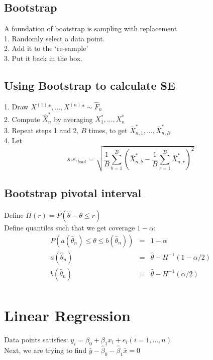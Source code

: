 \documentclass[12pt,a4paper]{article}
\begin{document}
\subsection*{Bootstrap}
A foundation of bootstrap is sampling with replacement\\
1. Randomly select a data point.\\
2. Add it to the `re-sample'\\
3. Put it back in the box.\\
\subsection*{Using Bootstrap to calculate SE}
1. Draw $X^{(1)}*,\ldots,X^{(n)}*\sim \hat F_n$\\
2. Compute $\hat X_n^*$ by averaging $X_1^*,\ldots,X_n^*$\\
3. Repeat steps 1 and 2, $B$ times, to get $\bar X_{n,1}^*,\ldots,\bar X_{n,B}^*$\\
4. Let 
$$
s.e._{boot} = \sqrt{\frac{1}{B}\sum_{b=1}^{B}\left(\bar X_{n,b}^*-\frac{1}{B}\sum_{r=1}^{B}\bar X_{n,r}^*\right)^2}
$$
\subsection*{Bootstrap pivotal interval}
Define $H(r)=P(\hat \theta-\theta\le r)$ \\
Define quantiles such that we get coverage $1-\alpha$:
\begin{eqnarray*}
P(a(\hat \theta_n)\le \theta \le b(\hat \theta_n)) &=& 1-\alpha\\
a(\hat \theta_n) &=&\hat \theta -H^{-1}(1-\alpha/2)\\
b(\hat \theta_n) &=& \hat \theta-H^{-1}(\alpha/2)\\
\end{eqnarray*}
\section*{Linear Regression}
Data points satisfies: $y_i=\beta_0+\beta_1x_i+e_i(i=1,\ldots,n)$\\
Next, we are trying to find $\bar y-\hat \beta_0-\hat\beta_1\bar x=0$
\end{document}
